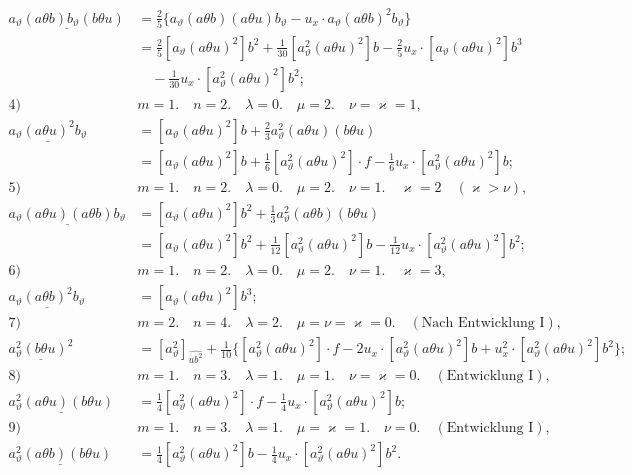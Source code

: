 \[
\begin{aligned}
\underline{a_\vartheta(a\theta b)b_\vartheta(b\theta u)}
&=\frac25\{a_\vartheta(a\theta b)(a\theta u)b_\vartheta-u_x\cdot a_\vartheta(a\theta b)^2b_\vartheta\}\\
&=\frac25[a_\vartheta(a\theta u)^2]b^2+\frac1{30}[a_\vartheta^2(a\theta u)^2]b-\frac25u_x\cdot[a_\vartheta(a\theta u)^2]b^3\\
&\quad-\frac1{30}u_x\cdot[a_\vartheta^2(a\theta u)^2]b^2;\\[0.7em]
\text{4)}\quad&m=1.\quad n=2.\quad \lambda=0.\quad \mu=2.\quad \nu=\varkappa=1,\\[0.25em]
\underline{a_\vartheta(a\theta u)^2b_\vartheta}
&=[a_\vartheta(a\theta u)^2]b+\frac23a_\vartheta^2(a\theta u)(b\theta u)\\
&=[a_\vartheta(a\theta u)^2]b+\frac16[a_\vartheta^2(a\theta u)^2]\cdot f-\frac16u_x\cdot[a_\vartheta^2(a\theta u)^2]b;\\[0.7em]
\text{5)}\quad&m=1.\quad n=2.\quad \lambda=0.\quad \mu=2.\quad \nu=1.\quad \varkappa=2\quad(\varkappa>\nu),\\[0.25em]
\underline{a_\vartheta(a\theta u)(a\theta b)b_\vartheta}
&=[a_\vartheta(a\theta u)^2]b^2+\frac13a_\vartheta^2(a\theta b)(b\theta u)\\
&=[a_\vartheta(a\theta u)^2]b^2+\frac1{12}[a_\vartheta^2(a\theta u)^2]b-\frac1{12}u_x\cdot[a_\vartheta^2(a\theta u)^2]b^2;\\[0.7em]
\text{6)}\quad&m=1.\quad n=2.\quad \lambda=0.\quad \mu=2.\quad \nu=1.\quad \varkappa=3,\\[0.25em]
\underline{a_\vartheta(a\theta b)^2b_\vartheta}&=[a_\vartheta(a\theta u)^2]b^3;\\[0.7em]
\text{7)}\quad&m=2.\quad n=4.\quad \lambda=2.\quad \mu=\nu=\varkappa=0.\quad(\text{Nach Entwicklung I}),\\[0.25em]
\underline{a_\vartheta^2(b\theta u)^2}&=[a_\vartheta^2]_{\widehat{ub^2}}+\frac1{10}\{[a_\vartheta^2(a\theta u)^2]\cdot f-2u_x\cdot[a_\vartheta^2(a\theta u)^2]b+u_x^2\cdot[a_\vartheta^2(a\theta u)^2]b^2\};\\[0.7em]
\text{8)}\quad&m=1.\quad n=3.\quad \lambda=1.\quad \mu=1.\quad \nu=\varkappa=0.\quad(\text{Entwicklung I}),\\[0.25em]
\underline{a_\vartheta^2(a\theta u)(b\theta u)}&=\frac14[a_\vartheta^2(a\theta u)^2]\cdot f-\frac14u_x\cdot[a_\vartheta^2(a\theta u)^2]b;\\[0.7em]
\text{9)}\quad&m=1.\quad n=3.\quad \lambda=1.\quad \mu=\varkappa=1.\quad \nu=0.\quad(\text{Entwicklung I}),\\[0.25em]
\underline{a_\vartheta^2(a\theta b)(b\theta u)}&=\frac14[a_\vartheta^2(a\theta u)^2]b-\frac14u_x\cdot[a_\vartheta^2(a\theta u)^2]b^2.
\end{aligned}
\]

